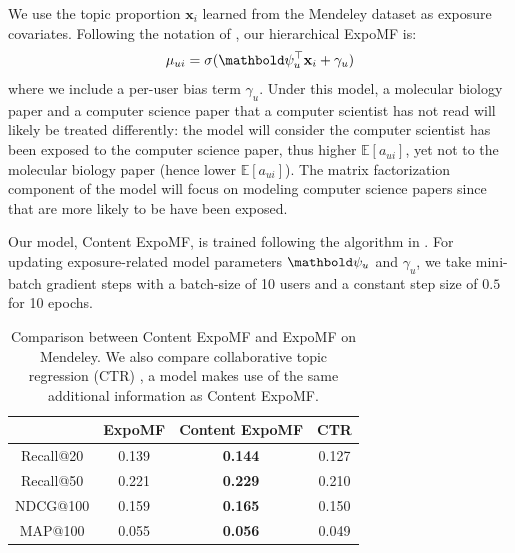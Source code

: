 We use the topic proportion $\mathbf{x}_i$ learned from the Mendeley dataset as
exposure covariates. Following the notation of , our
hierarchical ExpoMF is:
\begin{displaymath} \mu_{ui}= \sigma(\mb\psi_u^\top \mathbf{x}_i + \gamma_u)\end{displaymath}
where we include a per-user bias term $\gamma_u$. Under this model, a
molecular biology paper and a computer science paper that a computer
scientist has not read will likely be treated differently: the model will
consider the computer scientist has been exposed to the computer science
paper, thus higher $\mathbb{E}[a_{ui}]$, yet not to the molecular biology
paper (hence lower $\mathbb{E}[a_{ui}]$). The matrix factorization
component of the model will focus on modeling computer science papers
since that are more likely to be have been exposed. 

Our model, Content ExpoMF, is trained following the algorithm in
. For updating exposure-related model parameters
$\mb\psi_{u}$ and $\gamma_u$, we take mini-batch gradient steps with a
batch-size of 10 users and a constant step size of $0.5$ for 10 epochs.

\begin{table}
\centering
\begin{tabular}{ c c c c}
\hline
            & ExpoMF & Content ExpoMF & CTR \cite{wang2011collaborative} \\ \hline
  Recall@20 & 0.139 & \textbf{0.144}         & 0.127 \\ 
  Recall@50 & 0.221 & \textbf{0.229}         & 0.210 \\ 
  NDCG@100  & 0.159 & \textbf{0.165}         & 0.150 \\ 
  MAP@100   & 0.055 & \textbf{0.056}        & 0.049 \\ 
\hline 
\end{tabular}
\caption{Comparison between Content ExpoMF and ExpoMF on Mendeley. We also compare collaborative topic regression (CTR) \cite{wang2011collaborative}, a model makes use of the same additional information as Content ExpoMF. }
\label{tab:si_doc_results}
\end{table}


